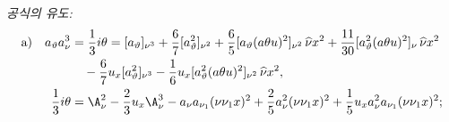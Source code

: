
\noindent\emph{공식의 유도:}
\[
\begin{aligned}
\text{a)}\quad
 a_\vartheta a_\nu^3
&=\frac13 i\theta
=[a_\vartheta]_{\nu^3}+\frac67[a_\vartheta^2]_{\nu^2}
+\frac65[a_\vartheta(a\theta u)^2]_{\nu^2}\,\widehat{\nu}x^2
+\frac{11}{30}[a_\vartheta^2(a\theta u)^2]_{\nu}\,\widehat{\nu}x^2\\
&\quad-\frac67u_x[a_\vartheta^2]_{\nu^3}
-\frac16u_x[a_\vartheta^2(a\theta u)^2]_{\nu^2}\,\widehat{\nu}x^2,\\
\frac13 i\theta
&=\A_\nu^2-\frac23u_x\A_\nu^3-a_\nu a_{\nu_1}(\nu\nu_1x)^2
+\frac25a_\nu^2(\nu\nu_1x)^2
+\frac15u_xa_\nu^2a_{\nu_1}(\nu\nu_1x)^2;
\end{aligned}
\]
